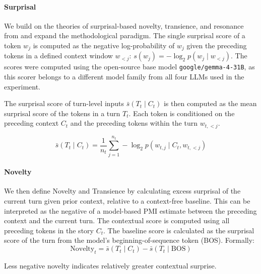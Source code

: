 \documentclass[11pt]{article}
\begin{document}
\paragraph{Surprisal}
We build on the theories of surprisal-based novelty, transience, and resonance from \citet{fundal2026directionalalignmentnarrativeagency} and expand the methodological paradigm. The single surprisal score of a token $w_j$ is computed as the negative log-probability of $w_j$ given the preceding tokens in a defined context window $w_{<j}$: $s(w_j) = -\log_2 p(w_j \mid w_{<j})$. The scores were computed using the open-source base model \texttt{google/gemma-4-31B}, as this scorer belongs to a different model family from all four LLMs used in the experiment. %

The surprisal score of turn-level inputs $\bar{s}(T_t \mid C_t)$ is then computed as the mean surprisal score of the tokens in a turn $T_t$. Each token is conditioned on the preceding context $C_t$ and the preceding tokens within the turn $w_{t,<j}$.

\begin{equation}
\bar{s}(T_t \mid C_t)
=
\frac{1}{n_t}
\sum_{j=1}^{n_t}
-\log_2 p(w_{t,j} \mid C_t, w_{t,<j})
\end{equation}
\paragraph{Novelty}
We then define Novelty and Transience by calculating excess surprisal of the current turn given prior context, relative to a context-free baseline.
This can be interpreted as the negative of a model-based PMI estimate between the preceding context and the current turn. The contextual score is computed using all preceding tokens in the story $C_t$. The baseline score is calculated as the surprisal score of the turn from the model's beginning-of-sequence token (BOS). Formally: 
\begin{equation}
\mathrm{Novelty}_t = \bar{s}(T_t \mid C_t) - \bar{s}(T_t \mid \mathrm{BOS})
\end{equation}

Less negative novelty indicates relatively greater contextual surprise. 
\end{document}

